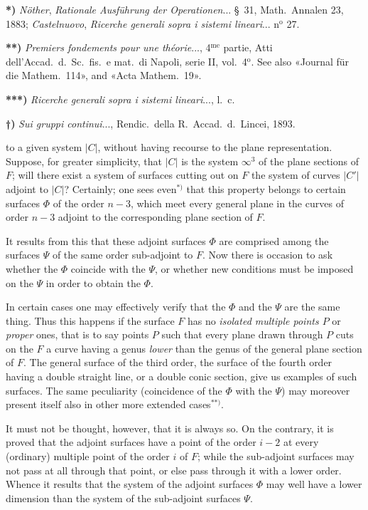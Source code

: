 \documentclass{article}
\begin{document}
\textbf{*)} \emph{Nöther}, \emph{Rationale Ausführung der Operationen}... §~31, Math.\ Annalen 23, 1883; \emph{Castelnuovo}, \emph{Ricerche generali sopra i sistemi lineari}... n${}^{\text{o}}$ 27.

\textbf{**)} \emph{Premiers fondements pour une théorie}..., 4${}^{\text{me}}$ partie, Atti dell'Accad.\ d.\ Sc.\ fis.\ e mat.\ di Napoli, serie II, vol.\ 4${}^{\text{o}}$. See also «Journal für die Mathem.\ 114», and «Acta Mathem.\ 19».

\textbf{***)} \emph{Ricerche generali sopra i sistemi lineari}..., l.\ c.

\textbf{†)} \emph{Sui gruppi continui}..., Rendic.\ della R.\ Accad.\ d.\ Lincei, 1893.

to a given system $|C|$, without having recourse to the plane representation. Suppose, for greater simplicity, that $|C|$ is the system $\infty^{3}$ of the plane sections of $F$; will there exist a system of surfaces cutting out on $F$ the system of curves $|C'|$ adjoint to $|C|$? Certainly; one sees even${}^{*)}$ that this property belongs to certain surfaces $\Phi$ of the order $n-3$, which meet every general plane in the curves of order $n-3$ adjoint to the corresponding plane section of $F$.

It results from this that these adjoint surfaces $\Phi$ are comprised among the surfaces $\Psi$ of the same order sub-adjoint to $F$. Now there is occasion to ask whether the $\Phi$ coincide with the $\Psi$, or whether new conditions must be imposed on the $\Psi$ in order to obtain the $\Phi$.

In certain cases one may effectively verify that the $\Phi$ and the $\Psi$ are the same thing. Thus this happens if the surface $F$ has no \emph{isolated multiple points $P$} or \emph{proper} ones, that is to say points $P$ such that every plane drawn through $P$ cuts on the $F$ a curve having a genus \emph{lower} than the genus of the general plane section of $F$. The general surface of the third order, the surface of the fourth order having a double straight line, or a double conic section, give us examples of such surfaces. The same peculiarity (coincidence of the $\Phi$ with the $\Psi$) may moreover present itself also in other more extended cases${}^{**)}$.

It must not be thought, however, that it is always so. On the contrary, it is proved that the adjoint surfaces have a point of the order $i-2$ at every (ordinary) multiple point of the order $i$ of $F$; while the sub-adjoint surfaces may not pass at all through that point, or else pass through it with a lower order. Whence it results that the system of the adjoint surfaces $\Phi$ may well have a lower dimension than the system of the sub-adjoint surfaces $\Psi$.
\end{document}
